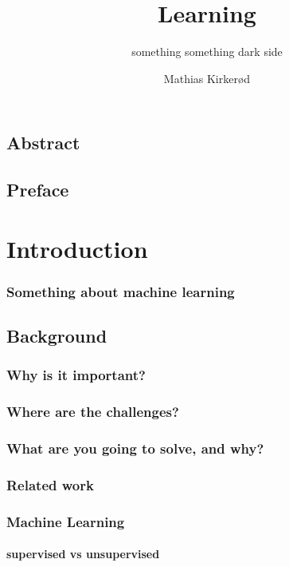 \documentclass[a4paper,english]{ifimaster}
\title{Learning}
\subtitle{something something dark side}
\author{Mathias Kirkerød}
\begin{document}
\duoforside[dept={Department of Informatics},
program={Informatics: Language and Communication},
long]

\frontmatter{}
\chapter*{Abstract}

\tableofcontents{}
\listoffigures{}
\listoftables{}

\chapter*{Preface}

\mainmatter{}
\part{Introduction}
	\section{Something about machine learning} 

\chapter{Background}
	\section{Why is it important?}
	\section{Where are the challenges?}
	\section{What are you going to solve, and why?}
	\section{Related work}
	
	\section{Machine Learning}
		\subsection{supervised vs unsupervised}
\end{document}
